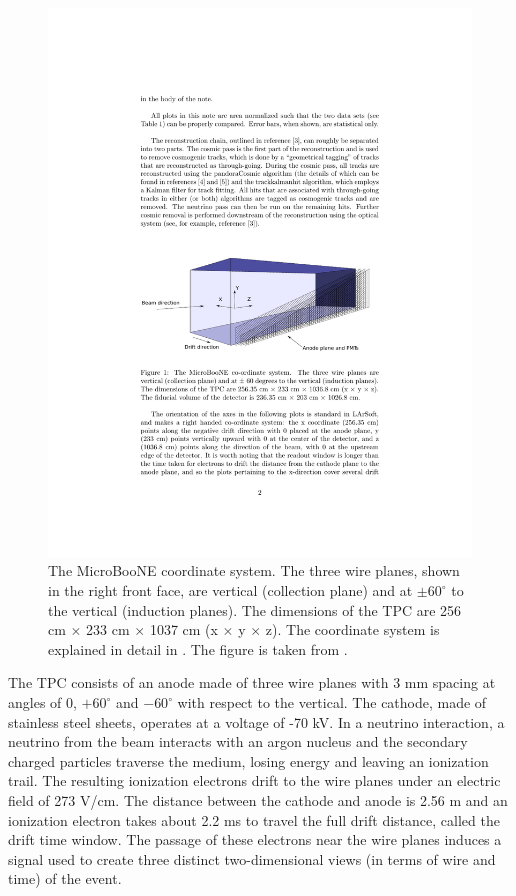 \documentclass[a4paper,11pt]{article}
\begin{document}
\begin{figure}[htbp]
  \begin{center}
    \includegraphics[width=0.8\linewidth]{figures/coord.pdf}

    \caption{The MicroBooNE coordinate system. The three wire planes, shown in the right front face, are vertical (collection plane) and at  $\pm60^{\circ}$ to the vertical (induction planes). The dimensions of the TPC are 256 cm $\times$ 233 cm $\times$ 1037 cm (x $\times$ y $\times$ z). The coordinate system is explained in detail in \cite{mcdata}. The figure is taken from \cite{mcdata}.} \label{fig:coord}
  \end{center}
\end{figure}

The TPC consists of an anode made of three wire planes with 3 mm spacing at angles of 0,  $+60^{\circ}$ and  $-60^{\circ}$ with respect to the vertical. The cathode, made of stainless steel sheets, operates at a voltage of -70 kV. In a neutrino interaction, a neutrino from the beam interacts with an argon nucleus and the secondary charged particles traverse the medium, losing energy and leaving an ionization trail. The resulting ionization electrons drift to the wire planes under an electric field of 273 V/cm. The distance between the cathode and anode is 2.56 m and an ionization electron takes about 2.2 ms to travel the full drift distance, called the drift time window. The passage of these electrons near the wire planes induces a signal used to create three distinct two-dimensional views (in terms of wire and time) of the event.
\end{document}

